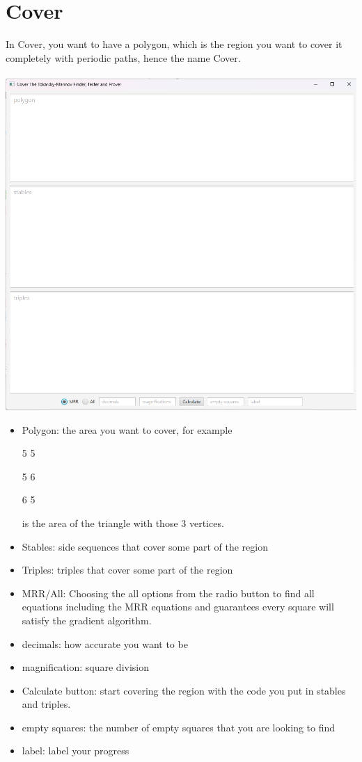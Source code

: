 \documentclass[11pt]{report}
\begin{document}
\section{Cover}\label{covwin}
In Cover, you want to have a polygon, which is the region you want to cover it completely with periodic paths, hence the name Cover.
\\ \\
\includegraphics[scale=0.5]{cover_window}
\begin{itemize}
  \item Polygon: the area you want to cover, for example
  
  5 5

  5 6

  6 5

  is the area of the triangle with those 3 vertices.
  \item Stables: side sequences that cover some part of the region
  \item Triples: triples that cover some part of the region
  \item MRR/All: Choosing the all options from the radio button to find all equations including the MRR equations and guarantees every square will satisfy the gradient algorithm.
  \item decimals: how accurate you want to be
  \item magnification: square division
  \item Calculate button: start covering the region with the code you put in stables and triples.
  \item empty squares: the number of empty squares that you are looking to find
  \item label: label your progress
\end{itemize}
\end{document}
